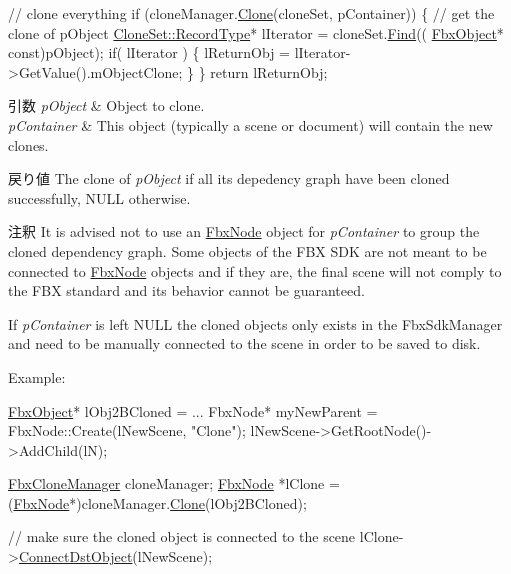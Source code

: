 \begin{DoxyCode}
\textcolor{comment}{// clone everything}
\textcolor{keywordflow}{if} (cloneManager.\hyperlink{class_fbx_clone_manager_a2fd72cbf71c6dd3105310445c1a7c2b1}{Clone}(cloneSet, pContainer))
\{
    \textcolor{comment}{// get the clone of pObject}
    \hyperlink{class_fbx_map_af8fc887461b3bf29f41aa36d15ddb54f}{CloneSet::RecordType}* lIterator = cloneSet.\hyperlink{class_fbx_map_a39d841b85599678c497c960e060d3772}{Find}((
      \hyperlink{class_fbx_object}{FbxObject}* \textcolor{keyword}{const})pObject);
    \textcolor{keywordflow}{if}( lIterator )
    \{
        lReturnObj = lIterator->GetValue().mObjectClone;
    \}    
\}
\textcolor{keywordflow}{return} lReturnObj;
\end{DoxyCode}



\begin{DoxyParams}{引数}
{\em p\+Object} & Object to clone. \\
\hline
{\em p\+Container} & This object (typically a scene or document) will contain the new clones. \\
\hline
\end{DoxyParams}
\begin{DoxyReturn}{戻り値}
The clone of {\itshape p\+Object} if all its depedency graph have been cloned successfully, N\+U\+LL otherwise. 
\end{DoxyReturn}
\begin{DoxyRemark}{注釈}
It is advised not to use an \hyperlink{class_fbx_node}{Fbx\+Node} object for {\itshape p\+Container} to group the cloned dependency graph. Some objects of the F\+BX S\+DK are not meant to be connected to \hyperlink{class_fbx_node}{Fbx\+Node} objects and if they are, the final scene will not comply to the F\+BX standard and its behavior cannot be guaranteed. 

If {\itshape p\+Container} is left {\ttfamily N\+U\+LL} the cloned objects only exists in the Fbx\+Sdk\+Manager and need to be manually connected to the scene in order to be saved to disk.
\end{DoxyRemark}
Example\+: 
\begin{DoxyCode}
\hyperlink{class_fbx_object}{FbxObject}* lObj2BCloned = ...
FbxNode* myNewParent = FbxNode::Create(lNewScene, \textcolor{stringliteral}{"Clone"});
lNewScene->GetRootNode()->AddChild(lN);

\hyperlink{class_fbx_clone_manager}{FbxCloneManager} cloneManager;
\hyperlink{class_fbx_node}{FbxNode} *lClone = (\hyperlink{class_fbx_node}{FbxNode}*)cloneManager.\hyperlink{class_fbx_clone_manager_a2fd72cbf71c6dd3105310445c1a7c2b1}{Clone}(lObj2BCloned);

\textcolor{comment}{// make sure the cloned object is connected to the scene}
lClone->\hyperlink{class_fbx_object_a3c7e883121fe1ceb271381146bd52ed0}{ConnectDstObject}(lNewScene);
\end{DoxyCode}
 \mbox{\label{class_fbx_clone_manager_a2a7f5f060bf0cf0737d0385542e1bc97}} 
